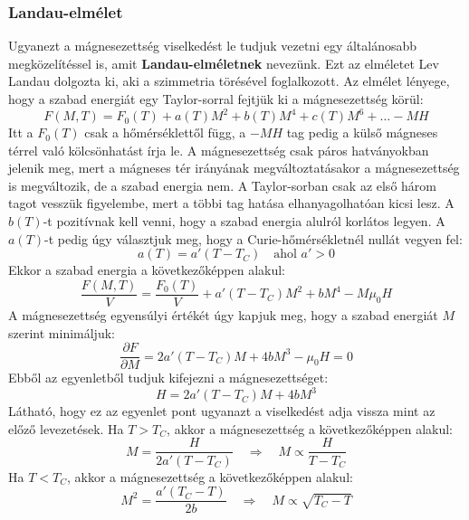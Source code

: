 \documentclass[../main.tex]{subfiles}
\begin{document}
\subsubsection{Landau-elmélet}
Ugyanezt a mágnesezettség viselkedést le tudjuk vezetni egy általánosabb megközelítéssel is, amit \textbf{Landau-elméletnek} nevezünk. Ezt az elméletet Lev Landau dolgozta ki, aki a szimmetria törésével foglalkozott. Az elmélet lényege, hogy a szabad energiát egy Taylor-sorral
fejtjük ki a mágnesezettség körül:
\begin{equation}
    F(M, T) = F_0(T) + a(T) M^2 + b(T) M^4 + c(T) M^6 + \ldots - MH
\end{equation}
Itt a $F_0(T)$ csak a hőmérséklettől függ, a $-MH$ tag pedig a külső mágneses térrel való kölcsönhatást írja le. A mágnesezettség csak páros hatványokban jelenik meg, mert a mágneses tér irányának megváltoztatásakor a mágnesezettség is megváltozik, de a szabad energia nem.
A Taylor-sorban csak az első három tagot vesszük figyelembe, mert a többi tag hatása elhanyagolhatóan kicsi lesz. A $b(T)$-t pozitívnak kell venni, hogy a szabad energia alulról korlátos legyen. A $a(T)$-t pedig úgy választjuk meg, hogy a Curie-hőmérsékletnél nullát vegyen fel:
\begin{equation}
    a(T) = a' (T - T_C) \quad \text{ahol } a' > 0
\end{equation}
Ekkor a szabad energia a következőképpen alakul:
\begin{equation}
    \frac{F(M, T)}{V} = \frac{F_0(T)}{V} + a' (T - T_C) M^2 + b M^4 - M\mu_0 H
\end{equation}
A mágnesezettség egyensúlyi értékét úgy kapjuk meg, hogy a szabad energiát $M$ szerint minimáljuk:
\begin{equation}
    \frac{\partial F}{\partial M} = 2 a' (T - T_C) M + 4 b M^3 - \mu_0 H = 0
\end{equation}
Ebből az egyenletből tudjuk kifejezni a mágnesezettséget:
\begin{equation}
    H = 2 a' (T - T_C) M + 4 b M^3
\end{equation}
Látható, hogy ez az egyenlet pont ugyanazt a viselkedést adja vissza mint az előző levezetések. Ha $T > T_C$, akkor a mágnesezettség a következőképpen alakul:
\begin{equation}
    M = \frac{H}{2 a' (T - T_C)} \quad \Rightarrow \quad M \propto \frac{H}{T - T_C}
\end{equation}
Ha $T < T_C$, akkor a mágnesezettség a következőképpen alakul:
\begin{equation}
    M^2 = \frac{a' (T_C - T)}{2 b} \quad \Rightarrow \quad M \propto \sqrt{T_C - T}
\end{equation}
\end{document}
